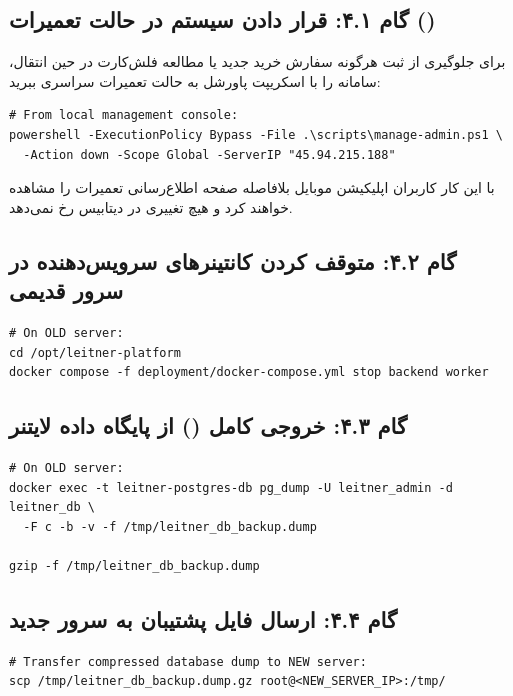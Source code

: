 \documentclass[11pt,a4paper]{article}
\begin{document}
\subsection{گام ۴.۱: قرار دادن سیستم در حالت تعمیرات ()}
برای جلوگیری از ثبت هرگونه سفارش خرید جدید یا مطالعه فلش‌کارت در حین انتقال، سامانه را با اسکریپت پاورشل به حالت تعمیرات سراسری ببرید:
\begin{latin}
\small
\begin{verbatim}
# From local management console:
powershell -ExecutionPolicy Bypass -File .\scripts\manage-admin.ps1 \
  -Action down -Scope Global -ServerIP "45.94.215.188"
\end{verbatim}
\end{latin}
با این کار کاربران اپلیکیشن موبایل بلافاصله صفحه اطلاع‌رسانی تعمیرات را مشاهده خواهند کرد و هیچ تغییری در دیتابیس رخ نمی‌دهد.

\subsection{گام ۴.۲: متوقف کردن کانتینرهای سرویس‌دهنده در سرور قدیمی}
\begin{latin}
\small
\begin{verbatim}
# On OLD server:
cd /opt/leitner-platform
docker compose -f deployment/docker-compose.yml stop backend worker
\end{verbatim}
\end{latin}

\subsection{گام ۴.۳: خروجی کامل () از پایگاه داده لایتنر}
\begin{latin}
\small
\begin{verbatim}
# On OLD server:
docker exec -t leitner-postgres-db pg_dump -U leitner_admin -d leitner_db \
  -F c -b -v -f /tmp/leitner_db_backup.dump

gzip -f /tmp/leitner_db_backup.dump
\end{verbatim}
\end{latin}

\subsection{گام ۴.۴: ارسال فایل پشتیبان به سرور جدید}
\begin{latin}
\small
\begin{verbatim}
# Transfer compressed database dump to NEW server:
scp /tmp/leitner_db_backup.dump.gz root@<NEW_SERVER_IP>:/tmp/
\end{verbatim}
\end{latin}
\end{document}
